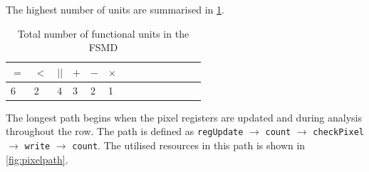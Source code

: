 \documentclass[a4paper, english]{article}
\numberwithin{equation}{section}
\begin{document}
The highest number of units are summarised in \cref{tbl:functotal}.
\begin{table}[H]
    \centering
    \caption{Total number of functional units in the FSMD}\label{tbl:functotal}
    \begin{tabular}{llllllllllllll}
        \toprule
        \(=\) & \(<\) & \(||\) & \(+\) & \(-\) & \(\times\) \\
        \midrule
        6     & 2     & 4      & 3     & 2     & 1          \\
        \bottomrule
    \end{tabular}
\end{table}
The longest path begins when the pixel registers are updated and during analysis throughout the row. The path is defined as \texttt{regUpdate} \(\rightarrow\) \texttt{count} \(\rightarrow\) \texttt{checkPixel} \(\rightarrow\) \texttt{write} \(\rightarrow\) \texttt{count}. The utilised resources in this path is shown in \cref{fig:pixelpath}.
\end{document}
